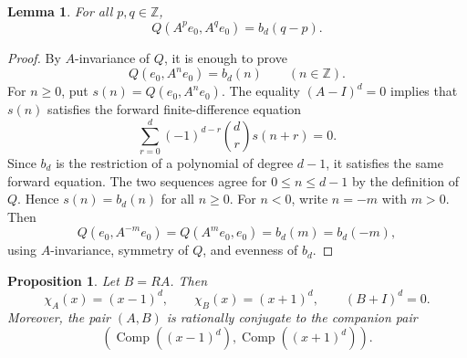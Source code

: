 \documentclass[a4paper,11pt]{amsart}
\newtheorem{proposition}[theorem]{Proposition}
\newtheorem{lemma}[theorem]{Lemma}
\theoremstyle{remark}
\newcommand{\Z}{\mathbb Z}
\DeclareMathOperator{\Comp}{Comp}
\numberwithin{equation}{section}
\begin{document}
\begin{lemma}\label{lem:orbit-gram}
For all \(p,q\in\Z\),
\[
        Q(A^p e_0,A^q e_0)=b_d(q-p).
\]
\end{lemma}

\begin{proof}
By \(A\)-invariance of \(Q\), it is enough to prove
\[
        Q(e_0,A^n e_0)=b_d(n)
        \qquad(n\in\Z).
\]
For \(n\ge0\), put \(s(n)=Q(e_0,A^n e_0)\).  The equality \((A-I)^d=0\) implies that \(s(n)\) satisfies the forward finite-difference equation
\[
        \sum_{r=0}^{d}(-1)^{d-r}\binom dr s(n+r)=0.
\]
Since \(b_d\) is the restriction of a polynomial of degree \(d-1\), it satisfies the same forward equation.  The two sequences agree for \(0\le n\le d-1\) by the definition of \(Q\).  Hence \(s(n)=b_d(n)\) for all \(n\ge0\).  For \(n<0\), write \(n=-m\) with \(m>0\).  Then
\[
        Q(e_0,A^{-m}e_0)=Q(A^m e_0,e_0)=b_d(m)=b_d(-m),
\]
using \(A\)-invariance, symmetry of \(Q\), and evenness of \(b_d\).
\end{proof}

\begin{proposition}\label{prop:normal-form}
Let \(B=RA\).  Then
\[
        \chi_A(x)=(x-1)^d,
        \qquad
        \chi_B(x)=(x+1)^d,
        \qquad
        (B+I)^d=0.
\]
Moreover, the pair \((A,B)\) is rationally conjugate to the companion pair
\[
        \left(\Comp((x-1)^d),\Comp((x+1)^d)\right).
\]
\end{proposition}
\end{document}
